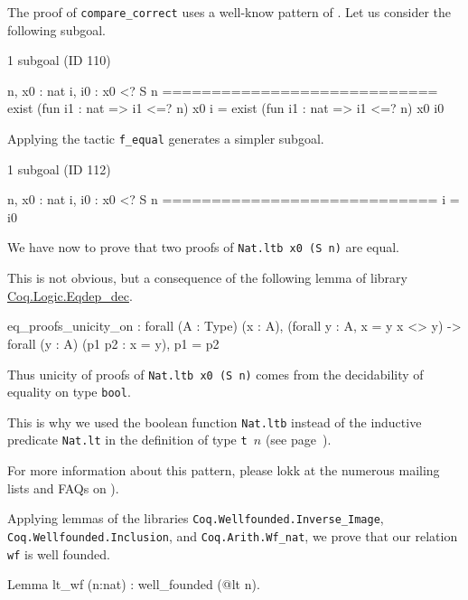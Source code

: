 \begin{remark}
 The proof of \texttt{compare\_correct} uses a well-know pattern of \coq{}.
Let us consider  the following subgoal.

\begin{Coqanswer}
 1 subgoal (ID 110)
  
  n, x0 : nat
  i, i0 : x0 <? S n
  ============================
  exist (fun i1 : nat => i1 <=? n) x0 i =
  exist (fun i1 : nat => i1 <=? n) x0 i0
\end{Coqanswer}

Applying the tactic \texttt{f\_equal} generates a simpler subgoal.

\begin{Coqanswer}
1 subgoal (ID 112)
  
  n, x0 : nat
  i, i0 : x0 <? S n
  ============================
  i = i0
\end{Coqanswer}

We have now to prove that two proofs of \texttt{Nat.ltb x0 (S n)} are equal.

This is not obvious, but  a consequence of the following lemma of library 
\href{https://coq.inria.fr/distrib/current/stdlib/Coq.Logic.Eqdep_dec.html}{Coq.Logic.Eqdep\_dec}.


\begin{Coqanswer}
eq_proofs_unicity_on :
forall (A : Type) (x : A),
(forall y : A, x = y \/ x <> y) -> forall (y : A) (p1 p2 : x = y), p1 = p2
\end{Coqanswer}

Thus unicity of proofs of \texttt{Nat.ltb x0 (S n)}  comes from the decidability of
equality on type \texttt{bool}.

This is why we used the boolean function \texttt{Nat.ltb} instead of the inductive predicate \texttt{Nat.lt} in the definition of type \texttt{t $n$} (see page~\pageref{def: Finite-ord-type}).

For more information about this pattern, please lokk at the numerous mailing lists and 
FAQs on \coq{}).



\end{remark}


Applying lemmas of the libraries \texttt{Coq.Wellfounded.Inverse\_Image},
 \texttt{Coq.Wellfounded.Inclusion}, and \texttt{Coq.Arith.Wf\_nat}, we prove that our
relation \texttt{wf} is well founded.

\begin{Coqsrc}
Lemma lt_wf (n:nat) : well_founded (@lt n).
\end{Coqsrc}

